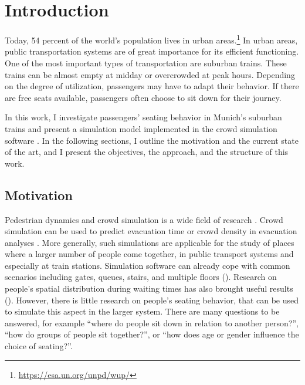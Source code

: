 \chapter{Introduction}
\label{ch:intro}


Today, 54 percent of the world's population lives in urban
areas.\footnote{\url{https://esa.un.org/unpd/wup/}}
In urban areas, public transportation systems are of great importance for its
efficient functioning.
One of the most important types of transportation are suburban trains.
These trains can be almost empty at midday or overcrowded at peak hours.
Depending on the degree of utilization, passengers may have to adapt their
behavior.
If there are free seats available, passengers often choose to sit down for their
journey.

In this work, I investigate passengers' seating behavior in Munich's suburban
trains and present a simulation model implemented in the crowd simulation
software \vadere.
In the following sections, I outline the motivation and the current state of the
art, and I present the objectives, the approach, and the structure of this work.

\section{Motivation}

Pedestrian dynamics and crowd simulation is a wide field of research
\citep{daamen-2014}.
Crowd simulation can be used to predict evacuation time or crowd density in
evacuation analyses
\citep{kirchner2002simulation,pelechano2006modeling,gao-2014,Alizadeh2011315}.
More generally, such simulations are applicable for the study of places where a
larger number of people come together, \eg in public transport systems and
especially at train stations.
Simulation software can already cope with common scenarios including gates,
queues, stairs, and multiple
floors (\eg \citet{koster-2015,koster-2014b,vadere2016:online}).
Research on people's spatial distribution during waiting times has also brought
useful results (\eg \citet{seitz-2015b,liu-2016,liu-2016b}).
However, there is little research on people's seating behavior, that can be used to
simulate this aspect in the larger system.
There are many questions to be answered, for example ``where do people sit down in
relation to another person?'', ``how do groups of people sit together?'', or
``how does age or gender influence the choice of seating?''.


